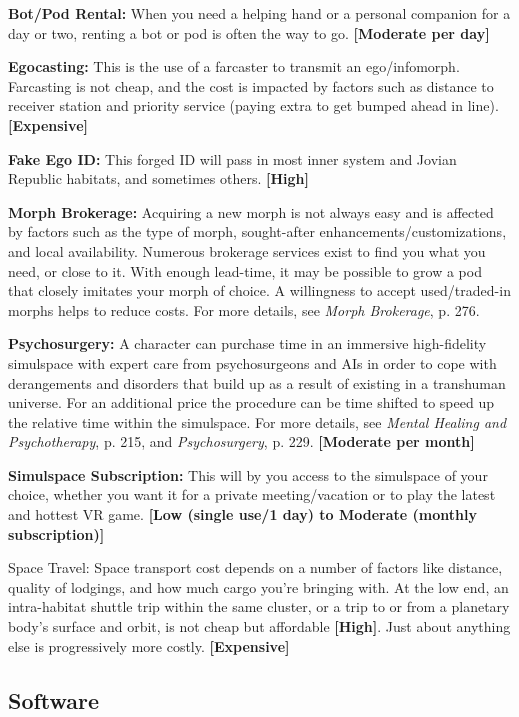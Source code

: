 \textbf{Bot/Pod Rental:} When you need a helping hand or a personal companion for a day or two, renting a bot or pod is often the way to go. \textbf{[Moderate per day]} 

\textbf{Egocasting:} This is the use of a farcaster to transmit an ego/infomorph. Farcasting is not cheap, and the cost is impacted by factors such as distance to receiver station and priority service (paying extra to get bumped ahead in line). \textbf{[Expensive]} 

\textbf{Fake Ego ID:} This forged ID will pass in most inner system and Jovian Republic habitats, and sometimes others. \textbf{[High]} 

\textbf{Morph Brokerage:} Acquiring a new morph is not always easy and is affected by factors such as the type of morph, sought-after enhancements/customizations, and local availability. Numerous brokerage services exist to find you what you need, or close to it. With enough lead-time, it may be possible to grow a pod that closely imitates your morph of choice. A willingness to accept used/traded-in morphs helps to reduce costs. For more details, see \emph{Morph Brokerage}, p. 276. 

\textbf{Psychosurgery:} A character can purchase time in an immersive high-fidelity simulspace with expert care from psychosurgeons and AIs in order to cope with derangements and disorders that build up as a result of existing in a transhuman universe. For an additional price the procedure can be time shifted to speed up the relative time within the simulspace. For more details, see \emph{Mental Healing and Psychotherapy}, p. 215, and \emph{Psychosurgery}, p. 229. \textbf{[Moderate per month]} 

\textbf{Simulspace Subscription:} This will by you access to the simulspace of your choice, whether you want it for a private meeting/vacation or to play the latest and hottest VR game. \textbf{[Low (single use/1 day) to Moderate (monthly subscription)]} 

Space Travel: Space transport cost depends on a number of factors like distance, quality of lodgings, and how much cargo you’re bringing with. At the low end, an intra-habitat shuttle trip within the same cluster, or a trip to or from a planetary body’s surface and orbit, is not cheap but affordable \textbf{[High]}. Just about anything else is progressively more costly. \textbf{[Expensive]} 

\subsection{Software} \label{sec:software} 

